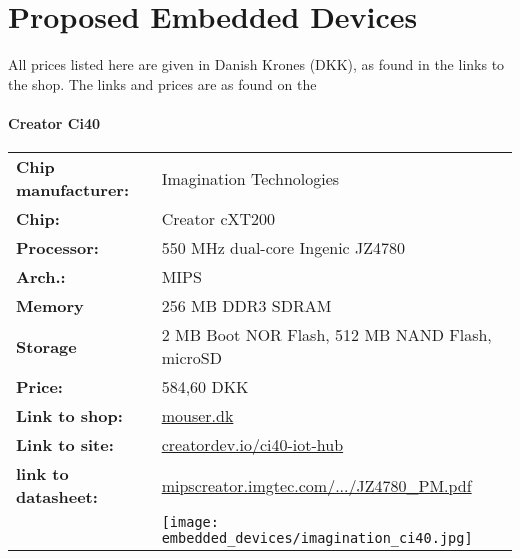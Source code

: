 \chapter{Proposed Embedded Devices}\label{app:embedded_devices}

All prices listed here are given in Danish Krones (DKK),
as found in the links to the shop.
The links and prices are as found on the 


\subsubsection*{Creator Ci40}
\begin{tabular}{ l l }

	\textbf{Chip manufacturer:} &
	Imagination Technologies \\

	\textbf{Chip:} &
	Creator cXT200 \\

	\textbf{Processor:} &
	550 MHz dual-core Ingenic JZ4780 \\

	\textbf{Arch.:} &
	MIPS \\

	\textbf{Memory} &
	256 MB DDR3 SDRAM \\

	\textbf{Storage} &
	2 MB Boot NOR Flash, 512 MB NAND Flash, microSD \\

	\textbf{Price:} &
	584,60 DKK \\

	\textbf{Link to shop:} &
	\href{http://www.mouser.dk/search/ProductDetail.aspx?R=0virtualkey0virtualkeyVL-62913}{mouser.dk} \\

	\textbf{Link to site:} &
	\href{http://www.creatordev.io/ci40-iot-hub}{creatordev.io/ci40-iot-hub} \\

	\textbf{link to datasheet:} &
	\href{http://mipscreator.imgtec.com/CI20/hardware/soc/JZ4780_PM.pdf}{mipscreator.imgtec.com/.../JZ4780\_PM.pdf} \\

	&
	\texttt{[image: embedded\_devices/imagination\_ci40.jpg]} \\

\end{tabular}


